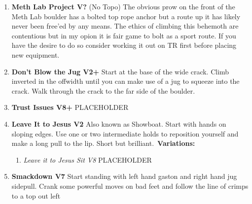 \label{pt:Octurnal}
\begin{enumerate}[]
	\setcounter{enumi}{0}
	\item\label{rt:Meth Lab Project} \colorbox{black!20}{\textbf{Meth Lab Project V?  \warn \warn \warn } }
	\newline (No Topo) 
	\newline The obvious prow on the front of the Meth Lab boulder has a bolted top rope anchor but a route up it has likely never been free'ed by any means. The ethics of climbing this behemoth are contentious but in my opion it is fair game to bolt as a sport route. If you have the desire to do so consider working it out on TR first before placing new equipment.\
	\setcounter{enumi}{1}
	\item\label{rt:Don't Blow the Jug} \colorbox{green!20}{\textbf{Don't Blow the Jug V2+    \warn } }
	\newline Start at the base of the wide crack. Climb inverted in the offwidth until you can make use of a jug to squeeze into the crack. Walk through the crack to the far side of the boulder.\
	\setcounter{enumi}{2}
	\item\label{rt:Trust Issues} \colorbox{Goldenrod!50}{\textbf{Trust Issues V8+  \warn \warn } }
	\newline PLACEHOLDER\
	\setcounter{enumi}{3}
	\item\label{rt:Leave It to Jesus} \colorbox{green!20}{\textbf{Leave It to Jesus V2   \ding{72}  } }
	\newline Also known as Showboat. Start with hands on sloping edges. Use one or two intermediate holds to reposition yourself and make a long pull to the lip. Short but brilliant.\
	\newline \textbf{Variations:}
	\begin{enumerate}
		\item\label{vr:Leave it to Jesus Sit} \colorbox{Goldenrod!50}{\emph{Leave it to Jesus Sit V8  }  }
		\newline PLACEHOLDER\
	\end{enumerate}
	\setcounter{enumi}{4}
	\item\label{rt:Smackdown} \colorbox{Goldenrod!50}{\textbf{Smackdown V7    } }
	\newline Start standing with left hand gaston and right hand jug sidepull. Crank some powerful moves on bad feet and follow the line of crimps to a top out left\

\end{enumerate}
